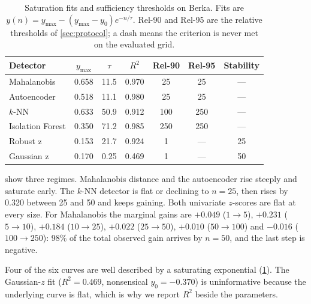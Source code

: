 \begin{table}[!t]
\caption{Saturation fits and sufficiency thresholds on Berka. Fits are $y(n)=y_{\max}-(y_{\max}-y_0)e^{-n/\tau}$. Rel-90 and Rel-95 are the relative thresholds of \cref{sec:protocol}; a dash means the criterion is never met on the evaluated grid.}
\label{tab:thresholds}
\centering\footnotesize\setlength{\tabcolsep}{3.5pt}
\begin{tabular}{l ccc ccc}
\toprule
Detector & $y_{\max}$ & $\tau$ & $R^2$ & Rel-90 & Rel-95 & Stability \\
\midrule
Mahalanobis      & 0.658 & 11.5 & 0.970 & 25  & 25  & --- \\
Autoencoder      & 0.518 & 11.1 & 0.980 & 25  & 25  & --- \\
$k$-NN           & 0.633 & 50.9 & 0.912 & 100 & 250 & --- \\
Isolation Forest & 0.350 & 71.2 & 0.985 & 250 & 250 & --- \\
Robust z         & 0.153 & 21.7 & 0.924 & 1   & --- & 25 \\
Gaussian z       & 0.170 & 0.25 & 0.469 & 1   & --- & 50 \\
\bottomrule
\end{tabular}
\end{table}

 show three regimes. Mahalanobis distance and the autoencoder rise steeply and saturate early. The $k$-NN detector is flat or declining to $n=25$, then rises by 0.320 between 25 and 50 and keeps gaining. Both univariate $z$-scores are flat at every size. For Mahalanobis the marginal gains are $+0.049$ ($1\to5$), $+0.231$ ($5\to10$), $+0.184$ ($10\to25$), $+0.022$ ($25\to50$), $+0.010$ ($50\to100$) and $-0.016$ ($100\to250$): 98\% of the total observed gain arrives by $n=50$, and the last step is negative.

Four of the six curves are well described by a saturating exponential (\cref{tab:thresholds}). The Gaussian-$z$ fit ($R^2=0.469$, nonsensical $y_0=-0.370$) is uninformative because the underlying curve is flat, which is why we report $R^2$ beside the parameters.

